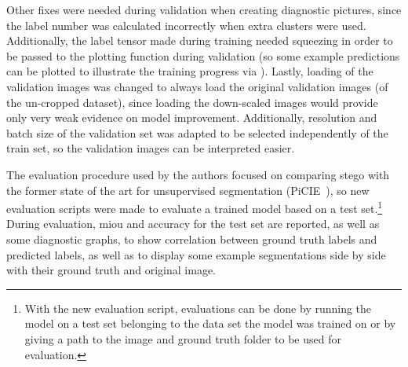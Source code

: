 Other fixes were needed during validation when creating diagnostic pictures, since the label number was calculated incorrectly when extra clusters were used.
Additionally, the label tensor made during training needed squeezing in order to be passed to the plotting function during validation (so some example predictions can be plotted to illustrate the training progress via \tensorboard).
Lastly, loading of the validation images was changed to always load the original validation images (of the un-cropped dataset), since loading the down-scaled images would provide only very weak evidence on model improvement.
Additionally, resolution and batch size of the validation set was adapted to be selected independently of the train set, so the validation images can be interpreted easier. 

The evaluation procedure used by the authors focused on comparing \gls{stego} with the former state of the art for unsupervised segmentation (PiCIE~\autocite{Cho2021}), so new evaluation scripts were made to evaluate a trained model based on a test set.\footnote{With the new evaluation script, evaluations can be done by running the model on a test set belonging to the data set the model was trained on or by giving a path to the image and ground truth folder to be used for evaluation.}
During evaluation, \gls{miou} and accuracy for the test set are reported, as well as some diagnostic graphs, to show correlation between ground truth labels and predicted labels, as well as to display some example segmentations side by side with their ground truth and original image.

